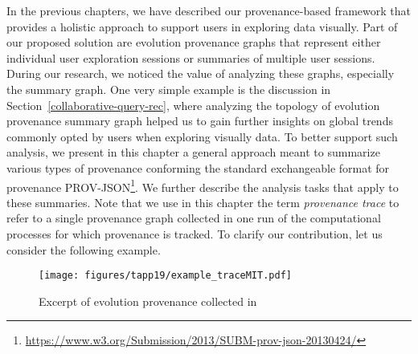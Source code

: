 


In the previous chapters, we have described our provenance-based framework that provides a holistic approach to support users in exploring data visually.
 Part of our proposed solution are evolution provenance graphs that represent either individual user exploration sessions or summaries of multiple user sessions. During our research, we noticed the value of analyzing these graphs, especially the summary graph. One very simple example is the discussion in Section~\ref{collaborative-query-rec}, where analyzing the topology of evolution provenance summary graph helped us to gain further insights on global trends commonly opted by users when exploring visually data.
To better support such analysis, we present in this chapter a general approach meant to summarize various types of provenance conforming the standard exchangeable format for provenance PROV-JSON\footnote{\url{https://www.w3.org/Submission/2013/SUBM-prov-json-20130424/}}. We further describe the analysis tasks that apply to these summaries. 
Note that we use in this chapter the term \emph{provenance trace} to refer to a single provenance graph collected in one run of the computational processes for which provenance is tracked.
To clarify our contribution, let us consider the following example. 



\begin{figure}[b]
\texttt{[image: figures/tapp19/example\_traceMIT.pdf]}
\caption{Excerpt of evolution provenance collected in \prototype{}}
\label{fig:universityX}
\end{figure}


